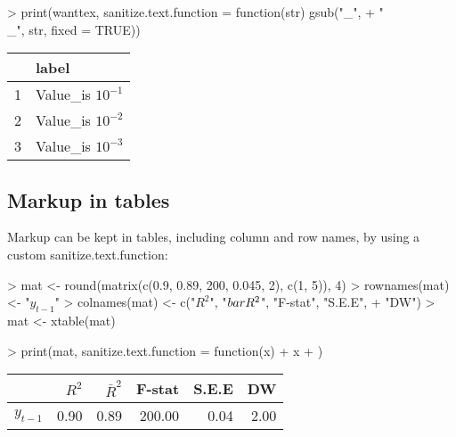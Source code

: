 \documentclass[letterpaper]{article}
\begin{document}
\begin{Schunk}
\begin{Sinput}
> print(wanttex, sanitize.text.function = function(str) gsub("_", 
+     "\\_", str, fixed = TRUE))
\end{Sinput}
% latex table generated in R 2.6.0 by xtable 1.5-2 package
% Wed Oct 10 14:26:37 2007
\begin{table}[ht]
\begin{center}
\begin{tabular}{rl}
  \hline
 & label \\
  \hline
1 & Value\_is $10^{-1}$ \\
  2 & Value\_is $10^{-2}$ \\
  3 & Value\_is $10^{-3}$ \\
   \hline
\end{tabular}
\end{center}
\end{table}\end{Schunk}

\subsection{Markup in tables}

Markup can be kept in tables, including column and row names, by using a custom sanitize.text.function:

\begin{Schunk}
\begin{Sinput}
> mat <- round(matrix(c(0.9, 0.89, 200, 0.045, 2), c(1, 5)), 4)
> rownames(mat) <- "$y_{t-1}$"
> colnames(mat) <- c("$R^2$", "$\\bar{R}^2$", "F-stat", "S.E.E", 
+     "DW")
> mat <- xtable(mat)
\end{Sinput}
\end{Schunk}
\begin{Schunk}
\begin{Sinput}
> print(mat, sanitize.text.function = function(x) {
+     x
+ })
\end{Sinput}
% latex table generated in R 2.6.0 by xtable 1.5-2 package
% Wed Oct 10 14:26:37 2007
\begin{table}[ht]
\begin{center}
\begin{tabular}{rrrrrr}
  \hline
 & $R^2$ & $\bar{R}^2$ & F-stat & S.E.E & DW \\
  \hline
$y_{t-1}$ & 0.90 & 0.89 & 200.00 & 0.04 & 2.00 \\
   \hline
\end{tabular}
\end{center}
\end{table}\end{Schunk}
\end{document}
